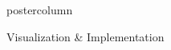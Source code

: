 \documentclass[final,hyperref={pdfpagelabels=false}]{beamer}
\begin{document}
\begin{frame}
\begin{columns}
\begin{column}{1\textwidth}
\begin{columns}[T]
\begin{column}{.484\textwidth}
\begin{beamercolorbox}[center,wd=\textwidth]{postercolumn}
\begin{minipage}[T]{.95\textwidth}
\begin{block}{\footnotesize Visualization \& Implementation}
%
%
\end{block}


\end{minipage}
\end{beamercolorbox}
\end{column}

\begin{column}{.016\textwidth}
\end{column}

\end{columns}



\end{column}
\end{columns}
\end{frame}
\end{document}
